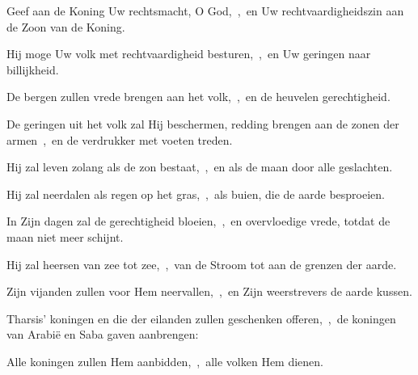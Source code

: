 \documentclass[12pt,twoside,a5paper]{article}
\begin{document}


\begin{halfparskip}
  Geef aan de Koning Uw rechtsmacht, O God,~\sep\ en Uw rechtvaardigheidszin aan de Zoon van de Koning.


  Hij moge Uw volk met rechtvaardigheid besturen,~\sep\ en Uw geringen naar billijkheid.

  De bergen zullen vrede brengen aan het volk,~\sep\ en de heuvelen gerechtigheid.

  De geringen uit het volk zal Hij beschermen, redding brengen aan de zonen der armen~\sep\ en de verdrukker met voeten treden.
\end{halfparskip}


\begin{halfparskip}
  Hij zal leven zolang als de zon bestaat,~\sep\ en als de maan door alle geslachten.

  Hij zal neerdalen als regen op het gras,~\sep\ als buien, die de aarde besproeien.

  In Zijn dagen zal de gerechtigheid bloeien,~\sep\ en overvloedige vrede, totdat de maan niet meer schijnt.
\end{halfparskip}


\begin{halfparskip}
  Hij zal heersen van zee tot zee,~\sep\ van de Stroom tot aan de grenzen der aarde.

  Zijn vijanden zullen voor Hem neervallen,~\sep\ en Zijn weerstrevers de aarde kussen.

  Tharsis' koningen en die der eilanden zullen geschenken offeren,~\sep\ de koningen van Arabië en Saba gaven aanbrengen:

  Alle koningen zullen Hem aanbidden,~\sep\ alle volken Hem dienen.
\end{halfparskip}

\end{document}
